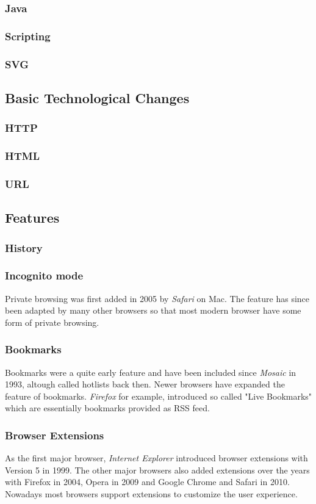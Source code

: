 \documentclass[runningheads]{llncs}
\begin{document}
			\subsubsection{Java}
			\subsubsection{Scripting}
			\subsubsection{SVG}
		\subsection{Basic Technological Changes}
			\subsubsection{HTTP}
			\subsubsection{HTML}
			\subsubsection{URL}
		\subsection{Features}
			\subsubsection{History}
			\subsubsection{Incognito mode}
			Private browsing was first added in 2005 by \textit{Safari} on Mac. The feature has since been adapted by many other browsers so that most modern browser have some form of private browsing.
			\subsubsection{Bookmarks}
			Bookmarks were a quite early feature and have been included since \textit{Mosaic} in 1993, altough called hotlists back then. Newer browsers have expanded the feature of bookmarks. \textit{Firefox} for example, introduced so called "Live Bookmarks" which are essentially bookmarks provided as RSS feed.
			\subsubsection{Browser Extensions}
			As the first major browser, \textit{Internet Explorer} introduced browser extensions with Version 5 in 1999. The other major browsers also added extensions over the years with Firefox in 2004, Opera in 2009 and Google Chrome and Safari in 2010. Nowadays most browsers support extensions to customize the user experience.
\end{document}

